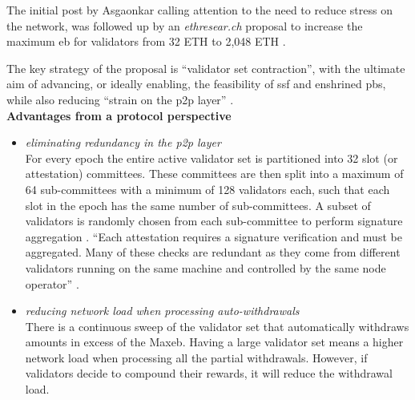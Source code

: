 \documentclass[UTF8]{article}
\begin{document}
The initial post by Asgaonkar \cite{Asgaonkar2023} calling attention to the need to reduce stress on the network, was followed up by an \textit{ethresear.ch} proposal to increase the maximum \gls{eb} for validators from 32 ETH to 2,048 ETH \cite{Neuder2023a}.

The key strategy of the proposal is ``validator set contraction'', with the ultimate aim of advancing, or ideally enabling, the feasibility of \gls{ssf} and 
enshrined \gls{pbs}, while also reducing ``strain on the \gls{p2p} layer'' \cite{Neuder2023a}.\\

\noindent
\textbf{Advantages from a protocol perspective}
\begin{itemize}
\item \textit{eliminating redundancy in the \gls{p2p} layer}\\
For every epoch the entire active validator set is partitioned into 32 slot (or attestation) committees. These committees are then split into a maximum of 64 sub-committees with a minimum of 128 validators each, such that each slot in the epoch has the same number of sub-committees. A subset of validators is randomly chosen from each sub-committee to perform signature aggregation \cite{Edgington2023}. ``Each attestation requires a signature verification and must be aggregated. Many of these checks are redundant as they come from different validators running on the same machine and controlled by the same node operator'' \cite{Neuder2023a}. 

\item \textit{reducing network load when processing auto-withdrawals}\\
There is a continuous sweep of the validator set that automatically withdraws amounts in excess of the Max\gls{eb}. Having a large validator set means a higher network load when processing all the partial withdrawals. However, if validators decide to compound their rewards, it will reduce the withdrawal load.
\end{itemize}
\end{document}
